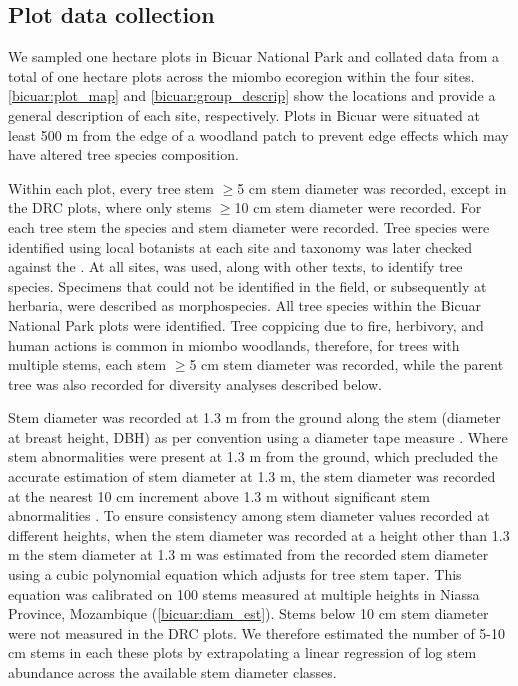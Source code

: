 \begin{refsection}
\subsection{Plot data collection}
\label{bicuar:ssec:plot_data}

We sampled \nplotsbicuar{} one hectare plots in Bicuar National Park and collated data from a total of \nplots{} one hectare plots across the miombo ecoregion within the four sites. \autoref{bicuar:plot_map} and \autoref{bicuar:group_descrip} show the locations and provide a general description of each site, respectively. Plots in Bicuar were situated at least 500 m from the edge of a woodland patch to prevent edge effects which may have altered tree species composition.

Within each plot, every tree stem $\ge$5 cm stem diameter was recorded, except in the DRC plots, where only stems $\ge$10 cm stem diameter were recorded. For each tree stem the species and stem diameter were recorded. Tree species were identified using local botanists at each site and taxonomy was later checked against the \citet{APD2020}. At all sites, \citet{Palgrave2003} was used, along with other texts, to identify tree species. Specimens that could not be identified in the field, or subsequently at herbaria, were described as morphospecies. All tree species within the Bicuar National Park plots were identified. Tree coppicing due to fire, herbivory, and human actions is common in miombo woodlands, therefore, for trees with multiple stems, each stem $\ge$5 cm stem diameter was recorded, while the parent tree was also recorded for diversity analyses described below.   

Stem diameter was recorded at 1.3 m from the ground along the stem (diameter at breast height, DBH) as per convention using a diameter tape measure \citep{Kershaw2017}. Where stem abnormalities were present at 1.3 m from the ground, which precluded the accurate estimation of stem diameter at 1.3 m, the stem diameter was recorded at the nearest 10 cm increment above 1.3 m without significant stem abnormalities \citep{Kershaw2017}. To ensure consistency among stem diameter values recorded at different heights, when the stem diameter was recorded at a height other than 1.3 m the stem diameter at 1.3 m was estimated from the recorded stem diameter using a cubic polynomial equation which adjusts for tree stem taper. This equation was calibrated on 100 stems measured at multiple heights in Niassa Province, Mozambique (\autoref{bicuar:diam_est}). Stems below 10 cm stem diameter were not measured in the DRC plots. We therefore estimated the number of 5-10 cm stems in each these plots by extrapolating a linear regression of log stem abundance across the available stem diameter classes.


\end{refsection}
